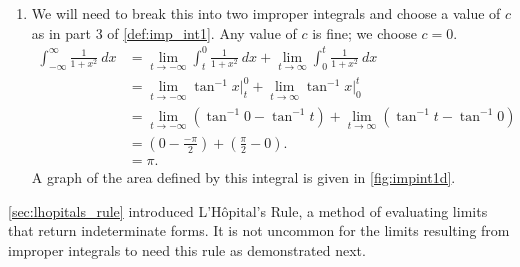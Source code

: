 \begin{example}
\begin{enumerate}

	\item	We will need to break this into two improper integrals and choose a value of $c$ as in part 3 of \autoref{def:imp_int1}. Any value of $c$ is fine; we choose $c=0$.
%
%
\begin{align*}
	\int_{-\infty}^\infty \frac1{1+x^2}\ dx
	&= \lim_{t\to-\infty} \int_t^0\frac{1}{1+x^2}\ dx + \lim_{t\to\infty} \int_0^t\frac{1}{1+x^2}\ dx \\
	&= \lim_{t\to-\infty} \tan^{-1}x\Big|_t^0 + \lim_{t\to\infty} \tan^{-1}x\Big|_0^t\\
	&= \lim_{t\to-\infty} \left(\tan^{-1}0-\tan^{-1}t\right) + \lim_{t\to\infty} \left(\tan^{-1}t-\tan^{-1}0\right)\\		
	&= \left(0-\frac{-\pi}2\right) + \left(\frac{\pi}2-0\right).\\
	&= \pi.
\end{align*}
A graph of the area defined by this integral is given in \autoref{fig:impint1d}.
\end{enumerate}
\end{example}

\autoref{sec:lhopitals_rule} introduced L'H\^opital's Rule, a method of evaluating limits that return indeterminate forms. It is not uncommon for the limits resulting from improper integrals to need this rule as demonstrated next.


